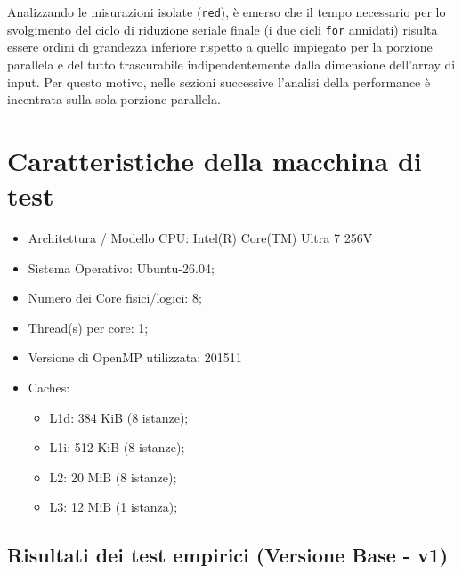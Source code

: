 \documentclass[a4paper,11pt]{article}
\begin{document}
Analizzando le misurazioni isolate (\texttt{red}), è emerso che il tempo necessario per lo svolgimento del ciclo di riduzione seriale finale (i due cicli \texttt{for} annidati) risulta essere ordini di grandezza inferiore rispetto a quello impiegato per la porzione parallela e del tutto trascurabile indipendentemente dalla dimensione dell'array di input. Per questo motivo, nelle sezioni successive l'analisi della performance è incentrata sulla sola porzione parallela.


\section{Caratteristiche della macchina di test}
\begin{itemize}
    \item Architettura / Modello CPU: Intel(R) Core(TM) Ultra 7 256V 
    \item Sistema Operativo: Ubuntu-26.04;
    \item Numero dei Core fisici/logici:  8; 
    \item Thread(s) per core: 1; 
    \item Versione di OpenMP utilizzata: 201511
    \item Caches:
    \begin{itemize}
        \item L1d: 384 KiB (8 istanze);
        \item L1i: 512 KiB (8 istanze);
        \item L2: 20 MiB (8 istanze);
        \item L3: 12 MiB (1 istanza);
    \end{itemize}
\end{itemize}
\newpage

\subsection*{Risultati dei test empirici (Versione Base - v1)}
\end{document}
